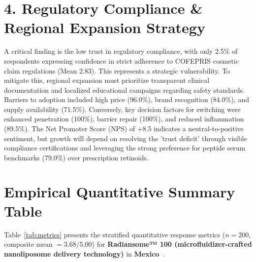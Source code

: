 \documentclass[10pt,twocolumn,a4paper]{article}
\begin{document}
\section{4. Regulatory Compliance \& Regional Expansion Strategy}
A critical finding is the low trust in regulatory compliance, with only 2.5\% of respondents expressing confidence in strict adherence to COFEPRIS cosmetic claim regulations (Mean 2.83). This represents a strategic vulnerability. To mitigate this, regional expansion must prioritize transparent clinical documentation and localized educational campaigns regarding safety standards. Barriers to adoption included high price (96.0\%), brand recognition (84.0\%), and supply availability (71.5\%). Conversely, key decision factors for switching were enhanced penetration (100\%), barrier repair (100\%), and reduced inflammation (89.5\%). The Net Promoter Score (NPS) of +8.5 indicates a neutral-to-positive sentiment, but growth will depend on resolving the 'trust deficit' through visible compliance certifications and leveraging the strong preference for peptide serum benchmarks (79.0\%) over prescription retinoids.


\section{Empirical Quantitative Summary Table}
Table~\ref{tab:metrics} presents the stratified quantitative response metrics ($n = 200$, composite mean $= 3.68/5.00$) for \textbf{Radiansome™ 100 (microfluidizer-crafted nanoliposome delivery technology)} in \textbf{Mexico}~\cite{ref_kaggle_doi,ref_hf_doi}.
\end{document}
